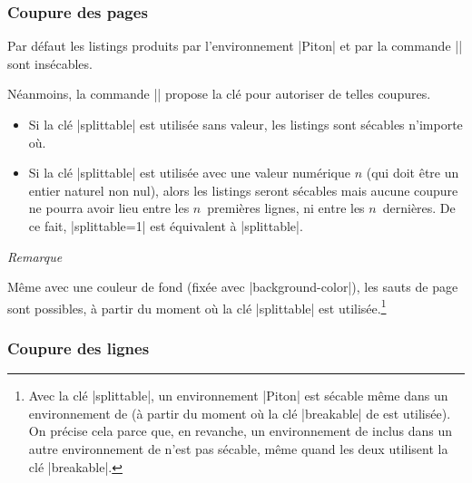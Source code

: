 \documentclass[dvipsnames,svgnames]{article}
\begin{document}
\subsubsection{Coupure des pages}


Par défaut les listings produits par l'environnement |{Piton}| et par la commande |\PitonInputFile| sont
insécables.

Néanmoins, la commande |\PitonOptions| propose la clé  pour autoriser de telles coupures.

\begin{itemize}
\item Si la clé |splittable| est utilisée sans valeur, les listings sont sécables n'importe où.

\item Si la clé |splittable| est utilisée avec une valeur numérique $n$ (qui doit être un entier naturel non nul),
alors les listings seront sécables mais aucune coupure ne pourra avoir lieu entre les $n$~premières lignes, ni
entre les $n$~dernières. De ce fait, |splittable=1| est équivalent à |splittable|.
\end{itemize}

\medskip
\emph{Remarque}\par\nobreak

Même avec une couleur de fond (fixée avec |background-color|), les sauts de page sont possibles, à partir du moment
où la clé |splittable| est utilisée.\footnote{Avec la clé |splittable|, un environnement |{Piton}| est sécable même dans un environnement de
   (à partir du moment où la clé |breakable| de  est utilisée). On précise cela parce
  que, en revanche, un environnement de  inclus dans un autre environnement de  n'est
  pas sécable, même quand les deux utilisent la clé |breakable|.}

\subsubsection{Coupure des lignes}

\label{line-breaks}
\end{document}
